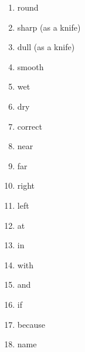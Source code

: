 \begin{multicols}{2}
\begin{enumerate}
\item   round 

\item   sharp (as a knife) 

\item   dull (as a knife) 

\item   smooth 

\item   wet 

\item   dry 

\item   correct 

\item   near 

\item   far 

\item   right 

\item   left 

\item   at 

\item   in 

\item   with 

\item   and 

\item   if 

\item   because 

\item   name 
\end{enumerate}
\end{multicols}






\pagebreak




